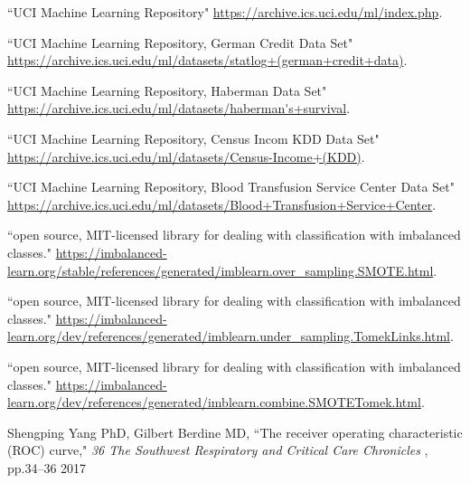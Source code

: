 \begin{thebibliography}{99}%

``UCI Machine Learning Repository" \url{https://archive.ics.uci.edu/ml/index.php}.

``UCI Machine Learning Repository, German Credit Data Set" \url{https://archive.ics.uci.edu/ml/datasets/statlog+(german+credit+data)}.

``UCI Machine Learning Repository, Haberman Data Set" \url{https://archive.ics.uci.edu/ml/datasets/haberman's+survival}.

``UCI Machine Learning Repository, Census Incom KDD Data Set" \url{https://archive.ics.uci.edu/ml/datasets/Census-Income+(KDD)}.

``UCI Machine Learning Repository, Blood Transfusion Service Center Data Set" \url{https://archive.ics.uci.edu/ml/datasets/Blood+Transfusion+Service+Center}.

``open source, MIT-licensed library for dealing with classification with imbalanced classes." \url{https://imbalanced-learn.org/stable/references/generated/imblearn.over_sampling.SMOTE.html}.

``open source, MIT-licensed library for dealing with classification with imbalanced classes." \url{https://imbalanced-learn.org/dev/references/generated/imblearn.under_sampling.TomekLinks.html}.

``open source, MIT-licensed library for dealing with classification with imbalanced classes." \url{https://imbalanced-learn.org/dev/references/generated/imblearn.combine.SMOTETomek.html}.

Shengping Yang PhD,
Gilbert Berdine MD,
``The receiver operating characteristic (ROC) curve," {\it 36 The Southwest Respiratory and Critical Care Chronicles }, pp.34–36 2017

\end{thebibliography}
